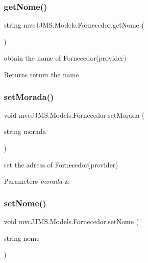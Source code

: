 \subsubsection{\texorpdfstring{get\+Nome()}{getNome()}}
{\footnotesize\ttfamily string mvc\+J\+J\+M\+S.\+Models.\+Fornecedor.\+get\+Nome (\begin{DoxyParamCaption}{ }\end{DoxyParamCaption})\hspace{0.3cm}{\ttfamily [inline]}}



obtain the name of Fornecedor(provider) 

\begin{DoxyReturn}{Returns}
return the name
\end{DoxyReturn}
\mbox{\label{classmvc_j_j_m_s_1_1_models_1_1_fornecedor_a8a3919c2983ee05ac36144ef604a9264}} 
\subsubsection{\texorpdfstring{set\+Morada()}{setMorada()}}
{\footnotesize\ttfamily void mvc\+J\+J\+M\+S.\+Models.\+Fornecedor.\+set\+Morada (\begin{DoxyParamCaption}\item[{string}]{morada }\end{DoxyParamCaption})\hspace{0.3cm}{\ttfamily [inline]}}



set the adress of Fornecedor(provider) 


\begin{DoxyParams}{Parameters}
{\em morada} & \\
\hline
\end{DoxyParams}
\mbox{\label{classmvc_j_j_m_s_1_1_models_1_1_fornecedor_a6197573e85fd7091904f00eda7444bc3}} 
\subsubsection{\texorpdfstring{set\+Nome()}{setNome()}}
{\footnotesize\ttfamily void mvc\+J\+J\+M\+S.\+Models.\+Fornecedor.\+set\+Nome (\begin{DoxyParamCaption}\item[{string}]{nome }\end{DoxyParamCaption})\hspace{0.3cm}{\ttfamily [inline]}}



